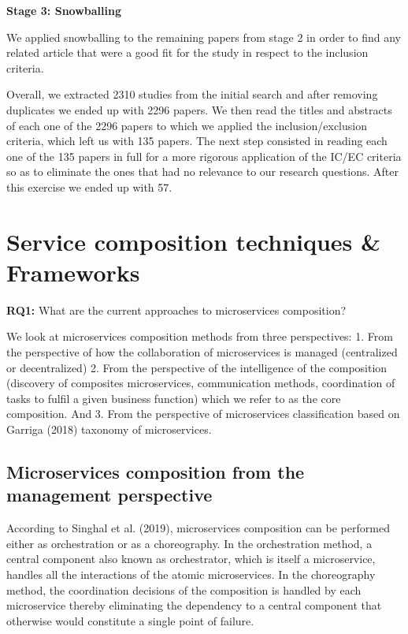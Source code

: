 \documentclass{article}
\begin{document}
\begin{multicols}{2}
\textbf{Stage 3: Snowballing}

We applied snowballing to the remaining papers from stage 2 in order to find any related article that were a good fit for the study in respect to the inclusion criteria.  

Overall, we extracted 2310 studies from the initial search and after removing duplicates we ended up with 2296 papers. We then read the titles and abstracts of each one of the 2296 papers to which we applied the inclusion/exclusion criteria, which left us with 135 papers. The next step consisted in reading each one of the 135 papers in full for a more rigorous application of the IC/EC criteria so as to eliminate the ones that had no relevance to our research questions. After this exercise we ended up with 57.

\section{Service composition techniques \& Frameworks}

\textbf{RQ1:}  What are the current approaches to microservices composition?

We look at microservices composition methods from three perspectives: 1. From the perspective of how the collaboration of microservices is managed (centralized or decentralized) 2. From the perspective of the intelligence of the composition (discovery of composites microservices, communication methods, coordination of tasks to fulfil a given business function) which we refer to as the core composition. And 3. From the perspective of microservices classification based on Garriga (2018) taxonomy of microservices.


\subsection{Microservices composition from the management perspective}


 According to Singhal et al. (2019), microservices composition can be performed either as orchestration or as a choreography. In the orchestration method, a central component also known as orchestrator, which is itself a microservice, handles all the interactions of the atomic microservices. In the choreography method, the coordination decisions of the composition is handled by each microservice thereby eliminating the dependency to a central component that otherwise would constitute a single point of failure. 
 

\end{multicols}
\end{document}
